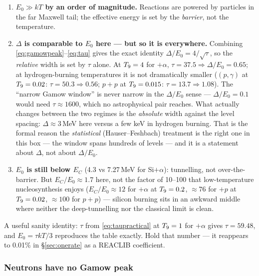 \begin{enumerate}
\item \textbf{$E_0 \gg kT$ by an order of magnitude.} Reactions are powered by
      particles in the far Maxwell tail; the effective energy is set by the
      \emph{barrier}, not the temperature.

\item \textbf{$\Delta$ is comparable to $E_0$ here --- but so it is
      everywhere.} Combining \eqref{eq:gamowpeak}--\eqref{eq:tau} gives the
      exact identity $\Delta/E_0 = 4/\sqrt\tau$, so the \emph{relative} width is
      set by $\tau$ alone. At $T_{9} = 4$ for $+\alpha$, $\tau = 37.5
      \Rightarrow \Delta/E_0 = 0.65$; at hydrogen-burning temperatures it is not
      dramatically smaller ($(p,\gamma)$ at $T_{9} = 0.02$: $\tau =
      50.3 \Rightarrow 0.56$; $p+p$ at $T_{9} = 0.015$: $\tau = 13.7 \Rightarrow
      1.08$). \derivedhere{} The ``narrow Gamow window'' is never narrow in the
      $\Delta/E_0$ sense --- $\Delta/E_0 = 0.1$ would need $\tau \approx 1600$,
      which no astrophysical pair reaches. What actually changes between the two
      regimes is the \emph{absolute} width against the level spacing: $\Delta
      \approx 3$\,MeV here versus a few keV in hydrogen burning. That is the
      formal reason the \emph{statistical} (Hauser--Feshbach) treatment is the
      right one in this box --- the window spans hundreds of levels --- and it
      is a statement about $\Delta$, not about $\Delta/E_0$.

\item \textbf{$E_0$ is still below $E_C$} (4.3 vs 7.27\,MeV for
      Si$+\alpha$): tunnelling, not over-the-barrier. But $E_C/E_0 \approx 1.7$
      here, not the factor of 10--100 that low-temperature nucleosynthesis
      enjoys ($E_C/E_0 \approx 12$ for $+\alpha$ at $T_{9} = 0.2$,
      $\approx 76$ for $+p$ at $T_{9} = 0.02$, $\approx 100$ for
      $p+p$) --- silicon burning sits in an awkward middle where neither the
      deep-tunnelling nor the classical limit is clean.
\end{enumerate}

A useful sanity identity: $\tau$ from \eqref{eq:taupractical} at $T_{9} = 1$ for
$+\alpha$ gives $\tau = \mathbf{59.48}$, and $E_0 = \tau kT/3$
reproduces the table exactly. Hold that number --- it reappears to 0.01\% in
\S\ref{sec:onerate} as a REACLIB coefficient.

\subsubsection{Neutrons have no Gamow peak}
\label{sec:no-gamow}

